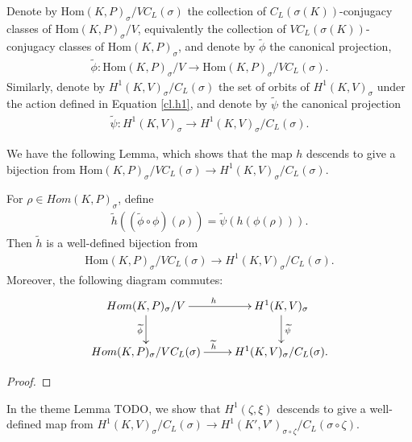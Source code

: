	\begin{definition}
		Denote by $\mathrm{Hom}(K, P)_\sigma/VC_L(\sigma)$ the collection of $C_L(\sigma(K))$-conjugacy classes of $\mathrm{Hom}(K, P)_\sigma/V$, equivalently the collection of $VC_L(\sigma(K))$-conjugacy classes of $\mathrm{Hom}(K, P)_\sigma$, and denote by $\widetilde{\phi}$ the canonical projection,
		\begin{align*}
			\widetilde{\phi}: \mathrm{Hom}(K, P)_\sigma/V \rightarrow \mathrm{Hom}(K, P)_\sigma/VC_L(\sigma).
		\end{align*}
		Similarly, denote by $H^1(K, V)_\sigma/C_L(\sigma)$ the set of orbits of $H^1(K, V)_\sigma$ under the action defined in Equation \ref{cl.h1}, and denote by $\widetilde{\psi}$ the canonical projection
		\begin{align*}
			\widetilde{\psi}:H^1(K, V)_\sigma \rightarrow H^1(K, V)_\sigma/C_L(\sigma).
		\end{align*}
	\end{definition}

	We have the following Lemma, which shows that the map $h$ descends to give a bijection from $\mathrm{Hom}(K, P)_\sigma /VC_L(\sigma) \rightarrow H^1(K, V)_{\sigma}/C_L(\sigma)$.

\begin{lemma}
	For $\rho \in Hom(K, P)_\sigma$, define
	\begin{align*}
		\widetilde{h}((\widetilde{\phi}\circ\phi)(\rho)) = \widetilde{\psi}(h(\phi(\rho))).
	\end{align*}
	Then $\widetilde{h}$ is a well-defined bijection from
	\begin{align*}
		\mathrm{Hom}(K, P)_\sigma / VC_L(\sigma) \rightarrow H^1(K, V)_\sigma/C_L(\sigma).
	\end{align*}
	Moreover, the following diagram commutes:
  \begin{align*}
    \xymatrix{
		Hom(K, P)_{\sigma}/V \ar[r]^h \ar[d]_{\widetilde{\phi}} & H^{1}(K, V)_\sigma \ar[d]^{\widetilde{\psi}} \\
		Hom(K, P)_{\sigma}/VC_L(\sigma) \ar[r]^{\widetilde{h}} & H^{1}(K, V)_\sigma/C_L(\sigma).
    }
  \end{align*}
\end{lemma}
\begin{proof}
\end{proof}

In the theme Lemma TODO, we show that $H^1(\zeta, \xi)$ descends to give a well-defined map from $H^1(K, V)_\sigma/C_L(\sigma) \rightarrow H^1(K', V')_{\sigma \circ \zeta}/C_L(\sigma \circ \zeta)$.

